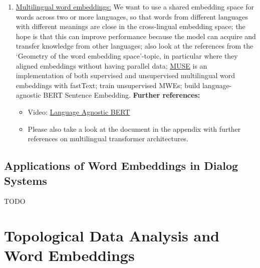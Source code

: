 \documentclass[11pt, a4paper]{amsart}
\begin{document}
\begin{enumerate}[resume]
    \item \underline{Multilingual word embeddings:}
    \newline
    We want to use a shared embedding space for words across two or more languages, so that words from different languages with different meanings are close in the cross-lingual embedding space;
    the hope is that this can improve performance because the model can acquire and transfer knowledge from other languages;
    also look at the references from the `Geometry of the word embedding space'-topic, in particular \cite{DBLP:journals/corr/abs-1710-04087} where they aligned embeddings without having parallel data;
    \href{https://github.com/facebookresearch/MUSE}{MUSE} is an implementation of both supervised and unsupervised multilingual word embeddings with fastText;
    \cite{DBLP:journals/corr/abs-1808-08933} train unsupervised MWEs;
    \cite{DBLP:journals/corr/abs-2007-01852} build language-agnostic BERT Sentence Embedding.
    \newline
    \textbf{Further references:}
    \begin{itemize}
        \item Video: \href{https://youtu.be/7tAWk_Coj-s}{Language Agnostic BERT}
        \item Please also take a look at the document in the appendix with further references on multilingual transformer architectures.
    \end{itemize}
\end{enumerate}

\subsection{Applications of Word Embeddings in Dialog Systems}

TODO

\section{Topological Data Analysis and Word Embeddings}
\end{document}
